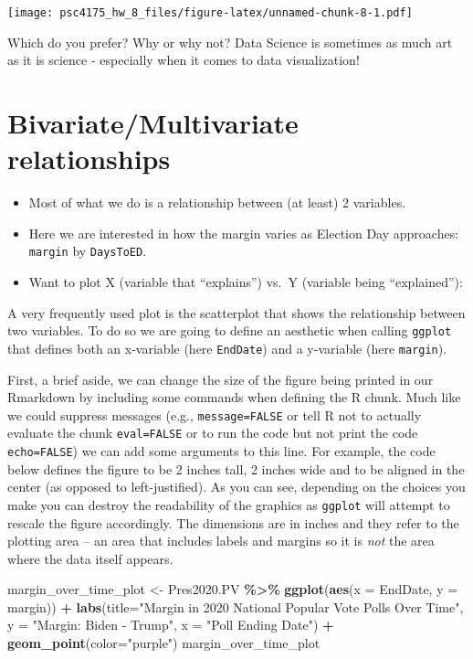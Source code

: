 \documentclass[
]{article}
\newenvironment{Shaded}{\begin{snugshade}}{\end{snugshade}}
\newcommand{\AttributeTok}[1]{\textcolor[rgb]{0.13,0.29,0.53}{#1}}
\newcommand{\FunctionTok}[1]{\textcolor[rgb]{0.13,0.29,0.53}{\textbf{#1}}}
\newcommand{\NormalTok}[1]{#1}
\newcommand{\OtherTok}[1]{\textcolor[rgb]{0.56,0.35,0.01}{#1}}
\newcommand{\SpecialCharTok}[1]{\textcolor[rgb]{0.81,0.36,0.00}{\textbf{#1}}}
\newcommand{\StringTok}[1]{\textcolor[rgb]{0.31,0.60,0.02}{#1}}
\begin{document}
\texttt{[image: psc4175\_hw\_8\_files/figure-latex/unnamed-chunk-8-1.pdf]}

Which do you prefer? Why or why not? Data Science is sometimes as much
art as it is science - especially when it comes to data visualization!

\section{Bivariate/Multivariate
relationships}\label{bivariatemultivariate-relationships}

\begin{itemize}
\item
  Most of what we do is a relationship between (at least) 2 variables.
\item
  Here we are interested in how the margin varies as Election Day
  approaches: \texttt{margin} by \texttt{DaysToED}.
\item
  Want to plot X (variable that ``explains'') vs.~Y (variable being
  ``explained''):
\end{itemize}

A very frequently used plot is the scatterplot that shows the
relationship between two variables. To do so we are going to define an
aesthetic when calling \texttt{ggplot} that defines both an x-variable
(here \texttt{EndDate}) and a y-variable (here \texttt{margin}).

First, a brief aside, we can change the size of the figure being printed
in our Rmarkdown by including some commands when defining the R chunk.
Much like we could suppress messages (e.g., \texttt{message=FALSE} or
tell R not to actually evaluate the chunk \texttt{eval=FALSE} or to run
the code but not print the code \texttt{echo=FALSE}) we can add some
arguments to this line. For example, the code below defines the figure
to be 2 inches tall, 2 inches wide and to be aligned in the center (as
opposed to left-justified). As you can see, depending on the choices you
make you can destroy the readability of the graphics as \texttt{ggplot}
will attempt to rescale the figure accordingly. The dimensions are in
inches and they refer to the plotting area -- an area that includes
labels and margins so it is \emph{not} the area where the data itself
appears.

\begin{Shaded}
\begin{Highlighting}[]
\NormalTok{margin\_over\_time\_plot }\OtherTok{\textless{}{-}}\NormalTok{ Pres2020.PV }\SpecialCharTok{\%\textgreater{}\%}
  \FunctionTok{ggplot}\NormalTok{(}\FunctionTok{aes}\NormalTok{(}\AttributeTok{x =}\NormalTok{ EndDate, }\AttributeTok{y =}\NormalTok{ margin)) }\SpecialCharTok{+} 
  \FunctionTok{labs}\NormalTok{(}\AttributeTok{title=}\StringTok{"Margin in 2020 National Popular Vote Polls Over Time"}\NormalTok{,}
       \AttributeTok{y =} \StringTok{"Margin: Biden {-} Trump"}\NormalTok{,}
       \AttributeTok{x =} \StringTok{"Poll Ending Date"}\NormalTok{) }\SpecialCharTok{+} 
  \FunctionTok{geom\_point}\NormalTok{(}\AttributeTok{color=}\StringTok{"purple"}\NormalTok{)}
\NormalTok{margin\_over\_time\_plot}
\end{Highlighting}
\end{Shaded}
\end{document}
